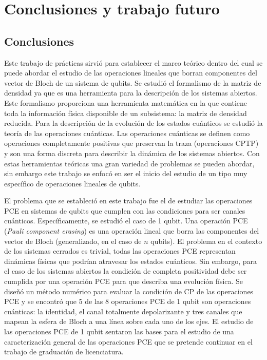 \chapter{Conclusiones y trabajo futuro}
\section{Conclusiones}
Este trabajo de prácticas sirvió para establecer el marco teórico dentro del 
cual se puede abordar el estudio de las operaciones lineales que borran 
componentes del vector de Bloch de un sistema de qubits. Se estudió 
el formalismo de la matriz de densidad ya que es una herramienta 
para la descripción de los sistemas abiertos. Este formalismo
proporciona  una herramienta matemática en la que contiene 
toda la información física disponible de un subsistema: la 
matriz de densidad reducida.
Para la descripción de la evolución de los estados
cuánticos se estudió la teoría de las operaciones cuánticas. Las 
operaciones cuánticas se definen como operaciones completamente
positivas que preservan la traza (operaciones CPTP) y son una 
forma discreta para describir la dinámica de los sistemas abiertos.
Con estas herramientas teóricas una gran variedad de problemas 
se pueden abordar, sin embargo este trabajo se enfocó en ser
el inicio del estudio de un tipo muy específico de operaciones lineales de qubits.

El problema que se estableció en este trabajo fue el de estudiar 
las operaciones PCE en sistemas de qubits que cumplen con las condiciones
para ser canales cuánticos. Específicamente, se estudió el caso de
1 qubit. Una operación PCE (\textit{Pauli component erasing}) es una 
operación lineal que borra las componentes del vector de Bloch 
(generalizado, en el caso de $n$ qubits). El problema en el contexto
de los sistemas cerrados es trivial, todas las operaciones PCE representan
dinámicas físicas que podrían atravesar los estados cuánticos. Sin embargo,
para el caso de los sistemas abiertos la condición de completa positividad 
debe ser cumplida por una operación PCE para que describa una evolución
física. Se diseñó un método numérico para evaluar la condición de CP 
de las operaciones PCE y se encontró que 5 de las 8 operaciones PCE 
de 1 qubit son operaciones cuánticas: la identidad, el canal totalmente
depolarizante y tres canales que mapean la esfera de Bloch a una 
línea sobre cada uno de los ejes. El estudio de las operaciones PCE 
de 1 qubit sentaron las bases para el estudio de una caracterización 
general de las operaciones PCE que se pretende continuar en el trabajo
de graduación de licenciatura.

